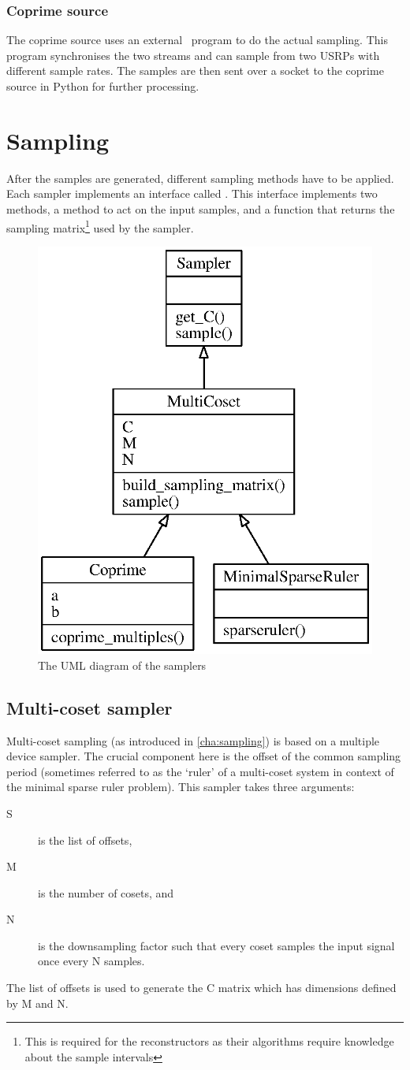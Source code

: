 \documentclass[a4paper, openany, oneside]{memoir}
\begin{document}
\subsubsection{Coprime source}
The coprime source uses an external \CC~program to do the actual sampling. This program synchronises the two streams and can sample from two USRPs with different sample rates. The samples are then sent over a socket to the coprime source in Python for further processing.


\section{Sampling}
\label{sec:sampling}
After the samples are generated, different sampling methods have to be applied. Each sampler implements an interface called . This interface implements two methods, a  method to act on the input samples, and a  function that returns the sampling matrix\footnote{This is required for the reconstructors as their algorithms require knowledge about the sample intervals} used by the sampler.

\begin{figure}
    \centering
    \includegraphics[width=0.5\linewidth]{./figures/classes_sampling.eps}
    \caption{The UML diagram of the samplers}
    \label{fig:}
\end{figure}

\subsection{Multi-coset sampler}
\label{sub:multi_coset_sampler}
Multi-coset sampling (as introduced in \cref{cha:sampling}) is based on a multiple device sampler. The crucial component here is the offset of the common sampling period (sometimes referred to as the `ruler' of a multi-coset system in context of the minimal sparse ruler problem). This sampler takes three arguments:
\begin{description}
    \item[S] is the list of offsets,
    \item[M] is the number of cosets, and
    \item[N] is the downsampling factor such that every coset samples the input signal once every N samples.
\end{description}
The list of offsets is used to generate the C matrix which has dimensions defined by M and N.
\end{document}
